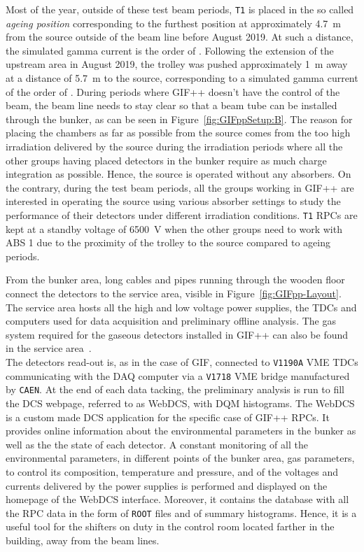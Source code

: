 	Most of the year, outside of these test beam periods, \texttt{T1} is placed in the so called \textit{ageing position} corresponding to the furthest position at approximately \SI{4.7}{m} from the source outside of the beam line before August 2019. At such a distance, the simulated gamma current is the order of  \siflux. Following the extension of the upstream area in August 2019, the trolley was pushed approximately \SI{1}{m} away at a distance of \SI{5.7}{m} to the source, corresponding to a simulated gamma current of the order of  \siflux. During periods where GIF++ doesn't have the control of the beam, the beam line needs to stay clear so that a beam tube can be installed through the bunker, as can be seen in Figure~\ref{fig:GIFppSetup:B}. The reason for placing the chambers as far as possible from the source comes from the too high irradiation delivered by the source during the irradiation periods where all the other groups having placed detectors in the bunker require as much charge integration as possible. Hence, the source is operated without any absorbers. On the contrary, during the test beam periods, all the groups working in GIF++ are interested in operating the source using various absorber settings to study the performance of their detectors under different irradiation conditions. \texttt{T1} RPCs are kept at a standby voltage of \SI{6500}{V} when the other groups need to work with ABS 1 due to the proximity of the trolley to the source compared to ageing periods.
	
	From the bunker area, long cables and pipes running through the wooden floor connect the detectors to the service area, visible in Figure~\ref{fig:GIFpp-Layout}. The service area hosts all the high and low voltage power supplies, the TDCs and computers used for data acquisition and preliminary offline analysis. The gas system required for the gaseous detectors installed in GIF++ can also be found in the service area~\cite{WEBDCS}.\\
	The detectors read-out is, as in the case of GIF, connected to \texttt{V1190A} VME TDCs communicating with the DAQ computer via a \texttt{V1718} VME bridge manufactured by \texttt{CAEN}. At the end of each data tacking, the preliminary analysis is run to fill the \acl{DCS} webpage, referred to as WebDCS, with \acf{DQM} histograms. The WebDCS is a custom made DCS application for the specific case of GIF++ RPCs. It provides online information about the environmental parameters in the bunker as well as the the state of each detector. A constant monitoring of all the environmental parameters, in different points of the bunker area, gas parameters, to control its composition, temperature and pressure, and of the voltages and currents delivered by the power supplies is performed and displayed on the homepage of the WebDCS interface. Moreover, it contains the database with all the RPC data in the form of \texttt{ROOT} files and of summary histograms. Hence, it is a useful tool for the shifters on duty in the control room located farther in the building, away from the beam lines.

